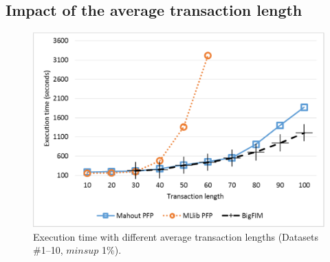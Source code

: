 



\subsection{Impact of the average transaction length}
\label{survey_attributes_exp}

\begin{figure}[!t]
\includegraphics[width=5in]{attributes.eps}
\caption{Execution time with different average transaction lengths %
(Datasets \#1--10, $minsup$ 1\%).}
\label{attributes}
\end{figure}

